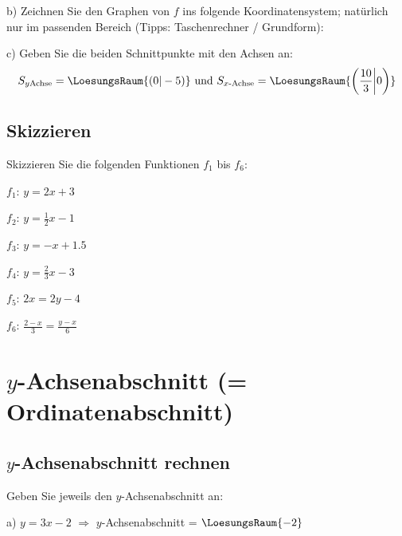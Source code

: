 b) Zeichnen Sie den Graphen von $f$ ins folgende
Koordinatensystem; natürlich nur im passenden Bereich (Tipps:
Taschenrechner / Grundform):


c) Geben Sie die beiden Schnittpunkte mit den Achsen an:
$$S_{y\text{Achse}} = \LoesungsRaum{(0|-5)}
\text{ und }
S_{x\text{-Achse}} = \LoesungsRaum{\left(\frac{10}3 \middle| 0\right)}$$
\newpage

\subsection{Skizzieren}
Skizzieren Sie die folgenden Funktionen $f_1$ bis $f_6$:

$f_1$: $y=2x+3$



$f_2$: $y=\frac12x-1$

\newpage


$f_3$: $y=-x+1.5$




$f_4$: $y=\frac23x-3$

\newpage


$f_5$: $2x=2y-4$ 




$f_6$: $\frac{2-x}3 = \frac{y-x}6$ 

\newpage

\section{$y$-Achsenabschnitt (= Ordinatenabschnitt)}

\subsection{$y$-Achsenabschnitt rechnen}

Geben Sie jeweils den $y$-Achsenabschnitt an:

a) $y=3x-2$ $\Longrightarrow$ $y$-Achsenabschnitt =
$\LoesungsRaum{-2}$

